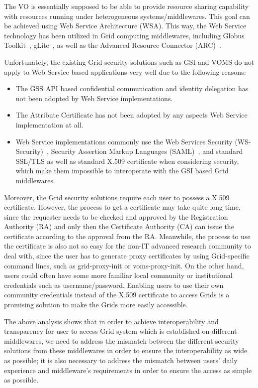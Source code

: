 \documentclass[twocolumn]{svjour3}         %
\begin{document}
The VO is essentially supposed to be able to provide resource sharing capability with resources running under heterogeneous systems/middlewares. This goal can be achieved using Web Service Architecture (WSA). This way, the Web Service technology has been utilized in Grid computing middlewares, including Globus Toolkit~\cite{GTlink}, gLite~\cite{gLitelink}, as well as the Advanced Resource Connector (ARC)~\cite{ARClink}.

Unfortunately, the existing Grid security solutions such as GSI and VOMS do not apply to Web Service based applications very well due to the following reasons:
\begin{itemize}
\item The GSS API based confidential communication and identity delegation has not been adopted by Web Service implementations.
\item The Attribute Certificate has not been adopted by any aspects Web Service implementation at all.
\item Web Service implementations commonly use the Web Services Security (WS-Security)~\cite{WSSeclink}, Security Assertion Markup Languages (SAML)~\cite{SAMLlink}, and standard SSL/TLS as well as standard X.509 certificate when considering security, which make them impossible to interoperate with the GSI based Grid middlewares.
\end{itemize}

Moreover, the Grid security solutions require each user to possess a X.509 certificate. However, the process to get a certificate may take quite long time, since the requester needs to be checked and approved by the Registration Authority (RA) and only then the Certificate Authority (CA) can issue the certificate according to the approval from the RA. Meanwhile, the process to use the certificate is also not so easy for the non-IT advanced research community to deal with, since the user has to generate proxy certificates by using Grid-specific command lines, such as grid-proxy-init or voms-proxy-init. On the other hand, users could often have some more familiar local community or institutional credentials such as username/password. Enabling users to use their own community credentials instead of the X.509 certificate to access Grids is a promising solution to make the Grids more easily accessible.

The above analysis shows that in order to achieve interoperability and transparency for user to access Grid system which is established on different middlewares, we need to address the mismatch between the different security solutions from these middlewares in order to ensure the interoperability as wide as possible; it is also necessary to address the mismatch between users' daily experience and middleware's requirements in order to ensure the access as simple as possible.
\end{document}
